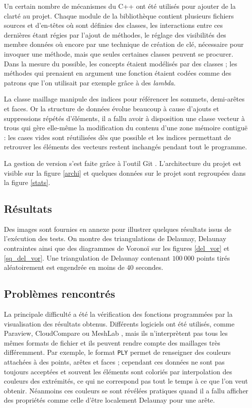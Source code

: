 \documentclass[12pt,a4paper]{report}
\begin{document}
Un certain nombre de mécanismes du C++ ont été utilisés pour ajouter de la clarté au projet. Chaque module de la bibliothèque contient plusieurs fichiers sources et d'en-têtes où sont définies des classes, les interactions entre ces dernières étant régies par l'ajout de méthodes, le réglage des visibilités des membre données où encore par une technique de création de clé, nécessaire pour invoquer une méthode, mais que seules certaines classes peuvent se procurer. Dans la mesure du possible, les concepts étaient modélisés par des classes ; les méthodes qui prenaient en argument une fonction étaient codées comme des patrons que l'on utilisait par exemple grâce à des \emph{lambda}.

La classe maillage manipule des indices pour référencer les sommets, demi-arêtes et faces. Or la structure de données évolue beaucoup à cause d'ajouts et suppressions répétés d'éléments, il a fallu avoir à disposition une classe \og vecteur à trous \fg{} qui gère elle-même la modification du contenu d'une zone mémoire contiguë : les cases vides sont réutilisées dès que possible et les indices permettant de retrouver les éléments des vecteurs restent inchangés pendant tout le programme.

\vspace{1cm}
La gestion de version s'est faite grâce à l'outil Git \cite{Git}.
L'architecture du projet est visible sur la figure \ref{archi} et quelques données sur le projet sont regroupées dans la figure \ref{stats}.


\subsection{Résultats}

Des images sont fournies en annexe pour illustrer quelques résultats issus de l'exécution des tests. On montre des triangulations de Delaunay, Delaunay contraintes ainsi que des diagrammes de Voronoï sur les figures \ref{del_vor} et \ref{sq_del_vor}. Une triangulation de Delaunay contenant $100\ 000$ points tirés aléatoirement est engendrée en moins de $40$ secondes.

\subsection{Problèmes rencontrés}

La principale difficulté a été la vérification des fonctions programmées par la visualisation des résultats obtenus. Différents logiciels ont été utilisés, comme Paraview, CloudCompare ou MeshLab \cite{Paraview, CloudCompare, MeshLab}, mais ils n'interprètent pas tous les mêmes formats de fichier et ils peuvent rendre compte des maillages très différemment. Par exemple, le format \verb+PLY+ permet de renseigner des couleurs attachées à des points, arêtes et faces ; cependant ces données ne sont pas toujours acceptées et souvent les éléments sont coloriés par interpolation des couleurs des extrémités, ce qui ne correspond pas tout le temps à ce que l'on veut obtenir. Néanmoins ces couleurs se sont révélées pratiques quand il a fallu afficher des propriétés comme celle d'être localement Delaunay pour une arête.
\end{document}
